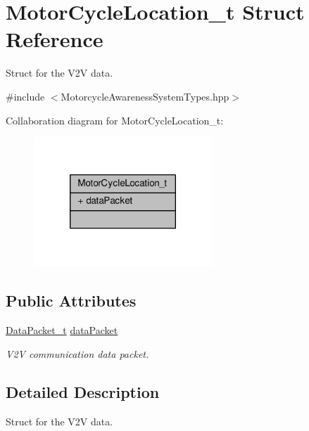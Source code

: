 \hypertarget{structMotorCycleLocation__t}{\section{Motor\-Cycle\-Location\-\_\-t Struct Reference}
\label{structMotorCycleLocation__t}
}


Struct for the V2\-V data.  




{\ttfamily \#include $<$Motorcycle\-Awareness\-System\-Types.\-hpp$>$}



Collaboration diagram for Motor\-Cycle\-Location\-\_\-t\-:\nopagebreak
\begin{figure}[H]
\begin{center}
\leavevmode
\includegraphics[width=190pt]{structMotorCycleLocation__t__coll__graph}
\end{center}
\end{figure}
\subsection*{Public Attributes}
\begin{DoxyCompactItemize}
\item 
\hyperlink{MotorcycleAwarenessSystemTypes_8hpp_ac0eb6e9beb8fa8db296c699fcc8494e6}{Data\-Packet\-\_\-t} \hyperlink{structMotorCycleLocation__t_a1f854587b19dbe91dffd637ce70be62e}{data\-Packet}
\begin{DoxyCompactList}\small\item\em V2\-V communication data packet. \end{DoxyCompactList}\end{DoxyCompactItemize}


\subsection{Detailed Description}
Struct for the V2\-V data. 

